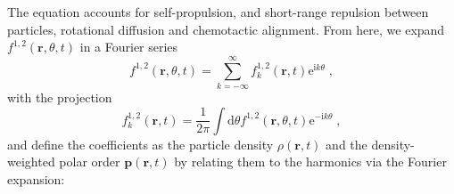 \documentclass{article}
\begin{document}
The equation accounts for self-propulsion, and short-range repulsion between particles, rotational diffusion and chemotactic alignment.
From here, we expand $f^{1,2}\left( \mathbf{r},\theta ,t \right)$ in a Fourier series 
\begin{equation}
    f ^{1,2}\left( \mathbf{r},\theta ,t \right) =\sum_{k=-\infty}^{\infty}{f _{k}^{1,2}\left( \mathbf{r},t \right) \mathrm{e}^{\mathrm{i}k\theta}}\;,
\end{equation} 
with the projection 
\begin{equation}
    \label{eq:fourierCoefficients}
    f _{k}^{1,2}\left( \mathbf{r},t \right) =\frac{1}{2\pi}\int{\mathrm{d}\theta f ^{1,2}\left( \mathbf{r},\theta ,t \right) \mathrm{e}^{-\mathrm{i}k\theta}}\;,
\end{equation}
and define the coefficients  as the particle density $ \rho\left(\mathbf{r}, t\right)$ and the density-weighted polar order $\boldsymbol{p}\left(\mathbf{r}, t\right)$ by relating them to the harmonics via the Fourier expansion:
\end{document}
